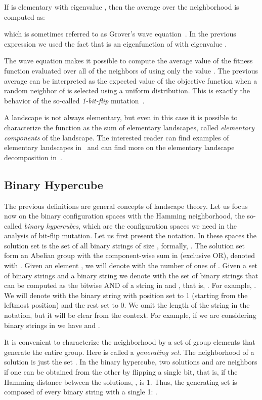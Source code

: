 \documentclass{article}
\begin{document}
If  is elementary with eigenvalue , then the average over the neighborhood is computed as:

which is sometimes referred to as Grover's wave equation~\citep{Grover1992local}. In the previous expression we used the fact that  is an eigenfunction of  with eigenvalue
.


The wave equation makes it possible to compute the average value of the fitness function  evaluated over all of the neighbors of  using only the value .
The previous average can be interpreted as the expected value of the objective function when a random neighbor of  is selected using a uniform distribution. This is exactly the behavior of the so-called \emph{1-bit-flip} mutation~\citep{Garnier1999}.


A landscape  is not always elementary, but even in this case it is possible to characterize the function  as the sum of elementary landscapes, called \emph{elementary components} of the landscape. The interested reader can find examples of elementary landscapes in~\cite{Whitley2008,WhitleySutton2009} and can find more on the elementary landscape decomposition in~\cite{Chicano2011ecj}.

\subsection{Binary Hypercube}
\label{subsec:binary}

The previous definitions are general concepts of landscape theory. Let us focus now on the binary configuration spaces with the Hamming neighborhood, the so-called \emph{binary hypercubes}, which are the configuration spaces we need in the analysis of bit-flip mutation. Let us first present the notation. In these spaces the solution set  is the set of all binary strings of size , formally, . The solution set form an Abelian group with the component-wise sum in  (exclusive OR), denoted with . Given an element , we will denote with  the number of ones of . Given a set of binary strings  and a binary string  we denote with  the set of binary strings that can be computed as the bitwise AND of a string in  and , that is, . For example, . We will denote with  the binary string with position  set to 1 (starting from the leftmost position) and the rest set to 0. We omit the length of the string  in the notation, but it will be clear from the context. For example, if we are considering binary strings in  we have  and .

It is convenient to characterize the neighborhood by a set of group elements  that generate the entire group. Here  is called a \emph{generating set}. The neighborhood of a solution  is just the set . In the binary hypercube, two solutions  and  are neighbors if one can be obtained from the other by flipping a single bit, that is, if the Hamming distance between the solutions, , is 1. Thus, the generating set is composed of every binary string with a single 1: .
\end{document}
